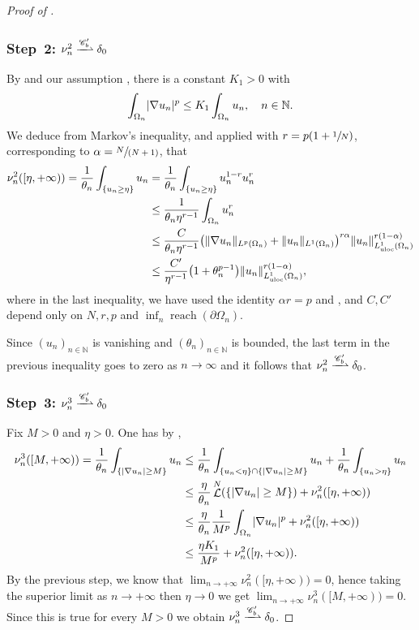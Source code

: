 \documentclass[JEP,XML,SOM,Unicode,published]{cedram}
\newcommand{\spfrac}[2]{{\sfrac{#1}{(#2)}}}
\theoremstyle{plain}
\theoremstyle{definition}
\newcommand{\N}{\mathbb{N}}
\newcommand{\Cspace}{\mathscr{C}}
\newcommand{\uloc}{L^1_\mathrm{uloc}}
\DeclarePairedDelimiter{\abs}{\lvert}{\rvert}
\DeclarePairedDelimiter{\norm}{\lVert}{\rVert}
\DeclareMathOperator{\lbm}{\mathcal{L}}
\DeclareMathOperator{\reach}{reach}
\newcommand{\narrowto}{\xrightharpoonup{\Cspace_b'}}
\begin{document}
\begin{proof}[Proof of ]
\subsubsection*{Step~2: $\nu_n^2 \narrowto \delta_{0}$} By  and our assumption , there is a constant \(K_1>0\) with
\begin{equation}
\label{nonHomogeneousSobolev}
\int_{\Omega_n}\abs{\nabla u_n}^p\leq K_1\int_{\Omega_n}u_n,\quad n\in\N.
\end{equation}
We deduce from Markov's inequality, and  applied with \(r=p(1+\sfrac 1N)\), corresponding to \(\alpha=\spfrac{N}{N+1}\), that
\begin{align*}
\nu^2_n([\eta,+\infty)) = \frac 1{\theta_n} \int_{\{u_n \geq \eta\}} u_n&= \frac 1{\theta_n} \int_{\{u_n \geq \eta\}} u_n^{1-r}u_n^r
\\
&\leq \frac{1}{\theta_n\eta^{r-1}}\int_{\Omega_n}u_n^r\\
&\leq \frac{C}{\theta_n\eta^{r-1}} \bigl(\norm{\nabla u_n}_{L^p(\Omega_n)}+\norm{u_n}_{L^1(\Omega_n)}\bigr)^{r\alpha} \norm{u_n}_{\uloc({\Omega}_n)}^{r(1-\alpha)}\\
&\leq \frac{C'}{\eta^{r-1}} \bigl(1+\theta_n^{p-1}\bigr)\norm{u_n}_{\uloc({\Omega}_n)}^{r(1-\alpha)},
\end{align*}
where in the last inequality, we have used the identity \(\alpha r=p\) and , and $C,C'$ depend only on $N,r,p$ and $\inf_n \reach(\partial \Omega_n)$.

Since \((u_n)_{n\in\N}\) is vanishing and \((\theta_n)_{n\in\N}\) is bounded, the last term in the previous inequality goes to zero as \(n\to\infty\) and it follows that $\nu_n^2 \narrowto \delta_0$.

\subsubsection*{Step~3: $\nu_n^3 \narrowto \delta_{0}$} Fix $M > 0$ and $\eta > 0$. One has by ,
\begin{align*}
\nu_n^3([M,+\infty)) = \frac 1{\theta_n} \int_{\{\abs{\nabla u_n} \geq M\}} u_n &\leq \frac 1{\theta_n} \int_{\{u_n < \eta\}\cap\{\abs{\nabla u_n} \geq M\}} u_n + \frac 1{\theta_n} \int_{\{u_n > \eta\}} u_n\\
&\leq \frac \eta{\theta_n} \lbm^N(\{\abs{\nabla u_n} \geq M\}) + \nu_n^2([\eta,+\infty))\\
&\leq \frac\eta{\theta_n} \frac 1{M^p} \int_{\Omega_n} \abs{\nabla u_n}^p + \nu_n^2([\eta,+\infty))\\
&\leq \frac{\eta K_1}{M^p}+ \nu_n^2([\eta,+\infty)).
\end{align*}
By the previous step, we know that $\lim_{n\to+\infty} \nu_n^2([\eta,+\infty)) = 0$, hence taking the superior limit as $n\to+\infty$ then $\eta \to 0$ we get
\(\lim_{n\to+\infty} \nu_n^3([M,+\infty)) = 0\).
Since this is true for every $M > 0$ we obtain $\nu_n^3 \narrowto \delta_0$.


\end{proof}
\end{document}
